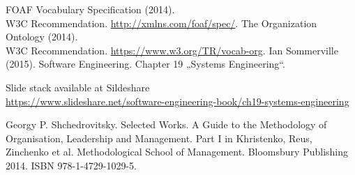 \documentclass[11pt,a4paper]{article}
\begin{document}
\begin{thebibliography}{xxx}

 FOAF Vocabulary Specification (2014).\\ W3C Recommendation.
  \url{http://xmlns.com/foaf/spec/}.
 The Organization Ontology (2014).\\  W3C Recommendation.
  \url{https://www.w3.org/TR/vocab-org}.
 Ian Sommerville (2015). Software Engineering.
  Chapter 19 „Systems Engineering“.

  Slide stack available at Sildeshare\\{\small
  \url{https://www.slideshare.net/software-engineering-book/ch19-systems-engineering}}

 Georgy P. Shchedrovitsky.  Selected Works. A Guide to the
  Methodology of Organisation, Leadership and Management. Part I in
  Khristenko, Reus, Zinchenko et al.  Methodological School of Management.
  Bloomsbury Publishing 2014.  ISBN 978-1-4729-1029-5.
\end{thebibliography}
\end{document}
